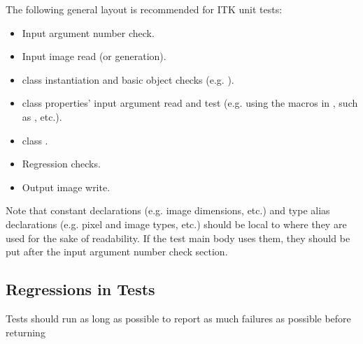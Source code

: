 The following general layout is recommended for ITK unit tests:
\begin{itemize}
\item Input argument number check.
\item Input image read (or generation).
\item {} class instantiation and basic object checks (e.g.
).
\item {} class properties' input argument read and test (e.g. using the
macros in , such as , etc.).
\item {} class .
\item Regression checks.
\item Output image write.
\end{itemize}

Note that constant declarations (e.g. image dimensions, etc.) and
type alias declarations (e.g. pixel and image types, etc.) should be local
to where they are used for the sake of readability. If the test main body uses
them, they should be put after the input argument number check section.


\subsection{Regressions in Tests}
\label{subsec:RegressionsInTests}

Tests should run as long as possible to report as much failures as possible before returning

